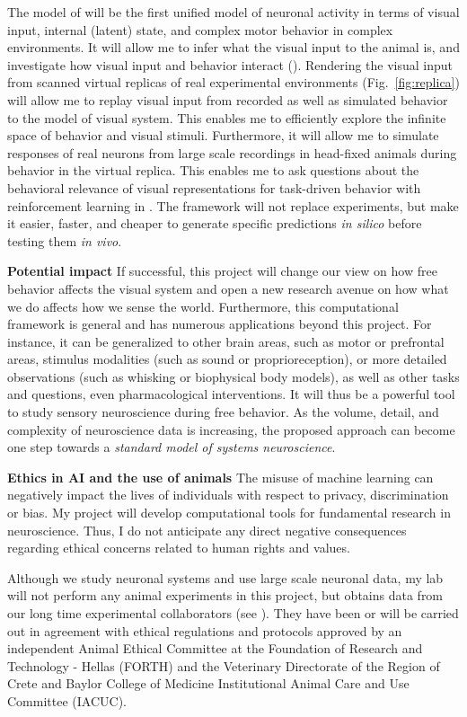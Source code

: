 \documentclass[B2,COG]{ercgrant}
\begin{document}
The model of  will be the first unified model of neuronal activity in terms of visual input, internal (latent) state, and complex motor behavior in complex environments. 
It will allow me to infer what the visual input to the animal is, and investigate how visual input and behavior interact (). 
Rendering the visual input from scanned virtual replicas of real experimental environments (Fig.~\ref{fig:replica}) will allow me to replay visual input from recorded as well as simulated behavior to the model of visual system.
This enables me to efficiently explore the infinite space of behavior and visual stimuli.
Furthermore, it will allow me to simulate responses of real neurons from large scale recordings in head-fixed animals during behavior in the virtual replica. 
This enables me to ask questions about the behavioral relevance of visual representations for task-driven behavior with reinforcement learning in .
The framework will not replace experiments, but make it easier, faster, and cheaper to generate specific predictions \textit{in silico} before testing them \textit{in vivo}.

\textbf{Potential impact} 
If successful, this project will change our view on how free behavior affects the visual system and open a new research avenue on how what we do affects how we sense the world. 
Furthermore, this computational framework is general and has numerous applications beyond this project. 
For instance, it can be generalized to other brain areas, such as motor or prefrontal areas, stimulus modalities (such as sound or proprioreception), or more detailed observations (such as whisking or biophysical body models), as well as other tasks and questions, even pharmacological interventions.
It will thus be a powerful tool to study sensory neuroscience during free behavior.
As the volume, detail, and complexity of neuroscience data is increasing, the proposed approach can become one step towards a \textit{standard model of systems neuroscience}.

\textbf{Ethics in AI and the use of animals}
The misuse of machine learning can negatively impact the lives of individuals with respect to privacy, discrimination or bias. 
My  project will develop computational tools for fundamental research in neuroscience. 
Thus, I do not anticipate any direct negative consequences regarding ethical concerns related to human rights and values.

Although we study neuronal systems and use large scale neuronal data, my lab will not perform any animal experiments in this project, but obtains  data from our long time experimental collaborators (see ). 
They have been or will be carried out in agreement with ethical regulations and protocols approved by an independent Animal Ethical Committee at the Foundation of Research and Technology - Hellas (FORTH) and the Veterinary Directorate of the Region of Crete and Baylor College of Medicine Institutional Animal Care and Use Committee (IACUC).
\end{document}
